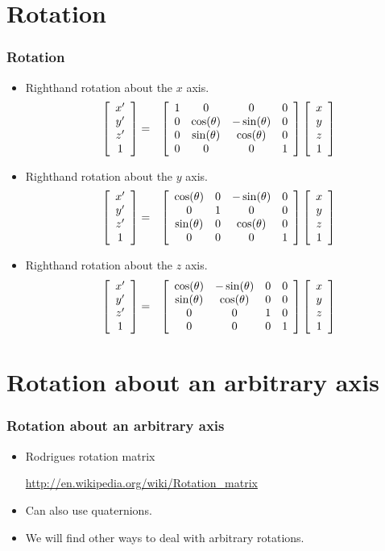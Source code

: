 \documentclass[slidestop,xcolor=pst,dvips]{beamer}
\newcommand{\sect}[1]{
\section{#1}
\begin{frame}[fragile]\frametitle{#1}
}
\begin{document}
\sect{Rotation}
\begin{itemize}
\item Righthand rotation about the $x$ axis.
\begin{eqnarray*}
\left[\begin{array}{c} x'\\y'\\z' \\ 1\end{array}\right] &=& 
\left[\begin{array}{cccc} 1&0&0&0 \\ 0&\cos(\theta)&-\sin(\theta)&0 \\ 0&\sin(\theta)&\cos(\theta)&0 \\0&0&0&1\end{array}\right]\left[\begin{array}{c} x\\y\\z \\ 1\end{array}\right]
\end{eqnarray*}
\item Righthand rotation about the $y$ axis.
\begin{eqnarray*}
\left[\begin{array}{c} x'\\y'\\z' \\ 1\end{array}\right] &=& 
\left[\begin{array}{cccc} \cos(\theta)&0&-\sin(\theta)&0 \\ 0&1&0&0 \\ \sin(\theta)&0&\cos(\theta)&0 \\0&0&0&1\end{array}\right]\left[\begin{array}{c} x\\y\\z \\ 1\end{array}\right]
\end{eqnarray*}
\item Righthand rotation about the $z$ axis.
\begin{eqnarray*}
\left[\begin{array}{c} x'\\y'\\z' \\ 1\end{array}\right] &=& 
\left[\begin{array}{cccc} \cos(\theta)&-\sin(\theta)&0&0 \\ \sin(\theta)&\cos(\theta)&0&0 \\ 0&0&1&0 \\0&0&0&1\end{array}\right]\left[\begin{array}{c} x\\y\\z \\ 1\end{array}\right]
\end{eqnarray*}
\end{itemize}
\end{frame}

\sect{Rotation about an arbitrary axis}

\begin{itemize}
\item
Rodrigues rotation matrix

\url{http://en.wikipedia.org/wiki/Rotation_matrix}

\item Can also use quaternions.
\item
We will find other ways to deal with arbitrary rotations.
\end{itemize}

\end{frame}

\newcommand{\bluebox}[4]{
\pspolygon[showpoints=true,fillstyle=solid,fillcolor=blue](#1,#2)(#1,#4)(#3,#4)(#3,#2)
\rput[tr](#1,#2){\tiny$(#1,#2)$}
\rput[bl](#3,#4){\tiny$(#3,#4)$}
}
\end{document}
